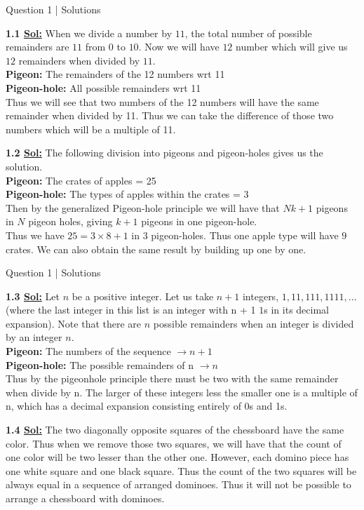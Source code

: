 \documentclass[xcolor=svgnames]{beamer}
\begin{document}
\begin{frame}{Question 1 | Solutions}
\small{
    \textbf{1.1 \underline{Sol:}} When we divide a number by $11$, the total number of possible remainders are $11$ from $0$ to $10$. Now we will have $12$ number which will give us $12$ remainders when divided by $11$. \\
    \textbf{Pigeon:} The remainders of the 12 numbers wrt 11 \\ 
    \textbf{Pigeon-hole:} All possible remainders wrt 11\\
    Thus we will see that two numbers of the 12 numbers will have the same remainder when divided by 11. Thus we can take the difference of those two numbers which will be a multiple of 11.
    \vspace{2mm}
    
    \textbf{1.2 \underline{Sol:}} The following division into pigeons and pigeon-holes gives us the solution. \\
    \textbf{Pigeon:} The crates of apples = 25\\
    \textbf{Pigeon-hole:} The types of apples within the crates = 3\\
    Then by the generalized Pigeon-hole principle we will have that $Nk + 1$ pigeons in $N$ pigeon holes, giving $k + 1$ pigeons in one pigeon-hole.\\ 
    Thus we have $25 = 3 \times 8 + 1$ in $3$ pigeon-holes. Thus one apple type will have $9$ crates. We can also obtain the same result by building up one by one. 
}
\end{frame}

\begin{frame}{Question 1 | Solutions}
\small{
    \textbf{1.3 \underline{Sol:}} Let $n$ be a positive integer. Let us take $n + 1$ integers, $1, 11, 111, 1111, \ldots$ (where the last integer in this list is an integer with n + 1 $1$s in its decimal expansion). Note that there are $n$ possible remainders when an integer is divided by an integer $n$. \\
    \textbf{Pigeon:} The numbers of the sequence $\rightarrow  n + 1$ \\
    \textbf{Pigeon-hole:} The possible remainders of n $\rightarrow  n$ \\
    Thus by the pigeonhole principle there must be two with the same remainder when divide by n. The larger of these integers less the smaller one is a multiple of n, which has a decimal expansion consisting entirely of 0s and 1s.
    \vspace{2mm}
    
    \textbf{1.4 \underline{Sol:}} The two diagonally opposite squares of the chessboard have the same color. Thus when we remove those two squares, we will have that the count of one color will be two lesser than the other one. However, each domino piece has one white square and one black square. Thus the count of the two squares will be always equal in a sequence of arranged dominoes. Thus it will not be possible to arrange a chessboard with dominoes.
}
\end{frame}
\end{document}
